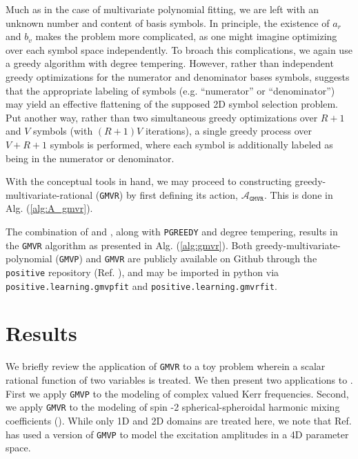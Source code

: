 \documentclass[twocolumn,aps,prd,floatfix,preprintnumbers,a4paper,nofootinbib,
superscriptaddress,10pt]{revtex4-1}
\def\gmvp#1{greedy-multivariate-polynomial#1
  (\texttt{GMVP}#1)\gdef\gmvp{\texttt{GMVP}}}
\def\gmvr#1{greedy-multivariate-rational#1
  (\texttt{GMVR}#1)\gdef\gmvr{\texttt{GMVR}}}
\def\pgreedy{\texttt{PGREEDY}}
\begin{document}
%
\par Much as in the case of multivariate polynomial fitting, we are left with an unknown number and content of basis symbols.
%
In principle, the existence of $a_r$ and $b_v$ makes the problem more complicated, as one might imagine optimizing over each symbol space independently.
%
To broach this complications, we again use a greedy algorithm with degree tempering.
%
However, rather than independent greedy optimizations for the numerator and denominator bases symbols,  suggests that the appropriate labeling of symbols (e.g. ``numerator'' or ``denominator'') may yield an effective flattening of the supposed 2D symbol selection problem.
%
Put another way, rather than two simultaneous greedy optimizations over $R+1$ and $V$ symbols (with $(R+1)V$ iterations), a single greedy process over $V+R+1$ symbols is performed, where each symbol is additionally labeled as being in the numerator or denominator.
%
\par With the conceptual tools in hand, we may proceed to constructing \gmvr{} by first defining its action, $\mathcal{A}_{\gmvr}$.
%
This is done in Alg. (\ref{alg:A_gmvr}).
%
\par The combination of  and , along with \pgreedy{} and degree tempering, results in the \gmvr{} algorithm as presented in Alg. (\ref{alg:gmvr}).
%
%
Both \gmvp{} and \gmvr{} are publicly available on Github through the \texttt{positive} repository (Ref. \cite{lionel_london_2018_1402516}), and may be imported in python via {\small{\texttt{positive.learning.gmvpfit}}} and {\small{\texttt{positive.learning.gmvrfit}}}.
%
%
\section{Results}
\label{results}
%
\par We briefly review the application of \gmvr{} to a toy problem wherein a scalar rational function of two variables is treated.
%
%
%
We then present two applications to .
%
First we apply \gmvp{} to the modeling of complex valued Kerr \qnm{} frequencies.
%
Second, we apply \gmvr{} to the modeling of spin -2 spherical-spheroidal harmonic mixing coefficients ().
%
While only 1D and 2D domains are treated here, we note that Ref. \cite{London:2018gaq} has used a version of \gmvp{} to model the \qnm{} excitation amplitudes in a 4D parameter space.
%
\end{document}
